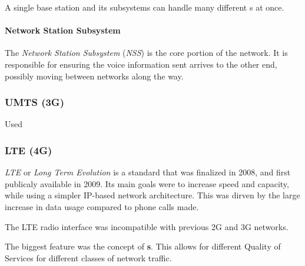A single base station and its subsystems can handle many different s at once.

\paragraph{Network Station Subsystem}\label{par:Network_Station_Subsystem}
\begin{definition}\label{def:Network_Station_Subsystem}
  The \emph{Network Station Subsystem} (\emph{NSS}) is the core portion of the network.
  It is responsible for ensuring the voice information sent arrives to the other end, possibly moving between networks along the way.
\end{definition}

\subsubsection{UMTS (3G)}\label{subsubsec:3G}
Used 

\subsubsection{LTE (4G)}\label{subsubsec:4G}
\begin{definition}[LTE]\label{def:LTE}
  \emph{LTE} or \emph{Long Term Evolution} is a standard that was finalized in 2008, and first publicaly available in 2009.
  Its main goals were to increase speed and capacity, while using a simpler IP-based network architecture.
  This was dirven by the large increase in data usage compared to phone calls made.

  The LTE radio interface was incompatible with previous 2G and 3G networks.

  The biggest feature was the concept of \textbf{s}.
  This allows for different Quality of Services for different classes of network traffic.
\end{definition}

